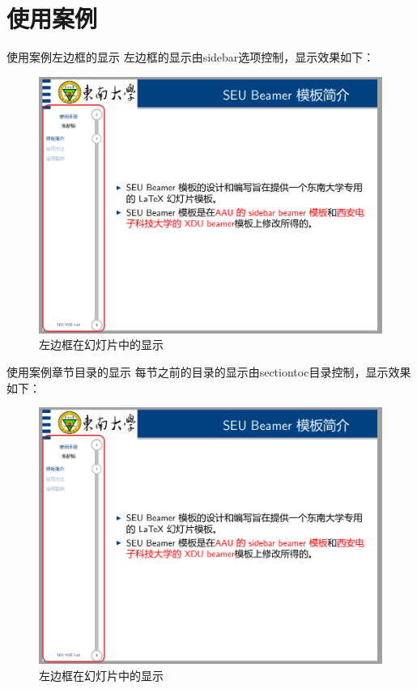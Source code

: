 \documentclass[10pt]{beamer}
\begin{document}
	\section{使用案例}
	\begin{frame}{使用案例}{左边框的显示}
		左边框的显示由sidebar选项控制，显示效果如下：
		\begin{figure}
			\centering
			\includegraphics[width=0.7\linewidth]{pictures/sidebar}
			\caption{左边框在幻灯片中的显示}
			\label{fig:sidebar}
		\end{figure}
	\end{frame}

	\begin{frame}{使用案例}{章节目录的显示}
		每节之前的目录的显示由sectiontoc目录控制，显示效果如下：
		\begin{figure}
			\centering
			\includegraphics[width=0.7\linewidth]{pictures/sidebar}
			\caption{左边框在幻灯片中的显示}
			\label{fig:sidebar}
		\end{figure}
	\end{frame}
	
	{\background%
		\begin{frame}
		\end{frame}
	}
\end{document}

